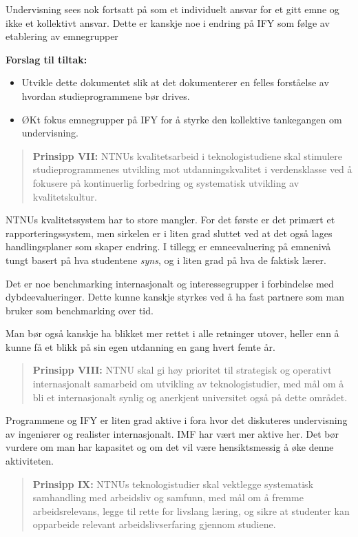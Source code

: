Undervisning sees nok fortsatt på som et individuelt ansvar for et gitt emne og ikke et kollektivt ansvar. Dette er kanskje noe i endring på IFY som følge av etablering av emnegrupper

\textbf{Forslag til tiltak:}

\begin{itemize}
	\item Utvikle dette dokumentet slik at det dokumenterer en felles forståelse av hvordan studieprogrammene bør drives.
	\item ØKt fokus emnegrupper på IFY for å styrke den kollektive tankegangen om undervisning.
\end{itemize}

\begin{quote}
	\textbf{Prinsipp VII:} NTNUs kvalitetsarbeid i teknologistudiene skal stimulere studieprogrammenes utvikling mot utdanningskvalitet i verdensklasse ved å fokusere på kontinuerlig forbedring og systematisk utvikling av kvalitetskultur.
\end{quote}

NTNUs kvalitetssystem har to store mangler. For det første er det primært et rapporteringssystem, men sirkelen er i liten grad sluttet ved at det også lages handlingsplaner som skaper endring. I tillegg er emneevaluering på emnenivå tungt basert på hva studentene \emph{syns}, og i liten grad på hva de faktisk lærer. 

Det er noe benchmarking internasjonalt og interessegrupper i forbindelse med dybdeevalueringer. Dette kunne kanskje styrkes ved å ha fast partnere som man bruker som benchmarking over tid. 

Man bør også kanskje ha blikket mer rettet i alle retninger utover, heller enn å kunne få et blikk på sin egen utdanning en gang hvert femte år.

\begin{quote}
	\textbf{Prinsipp VIII:} NTNU skal gi høy prioritet til strategisk og operativt internasjonalt samarbeid om utvikling av teknologistudier, med mål om å bli et internasjonalt synlig og anerkjent universitet også på dette området.
\end{quote}

Programmene og IFY er liten grad aktive i fora hvor det diskuteres undervisning av ingeniører og realister internasjonalt. IMF har vært mer aktive her. Det bør vurdere om man har kapasitet og om det vil være hensiktsmessig å øke denne aktiviteten.

\begin{quote}
	\textbf{Prinsipp IX:} NTNUs teknologistudier skal vektlegge systematisk samhandling med arbeidsliv og samfunn, med mål om å fremme arbeidsrelevans, legge til rette for livslang læring, og sikre at studenter kan opparbeide relevant arbeidslivserfaring gjennom studiene.
\end{quote}

